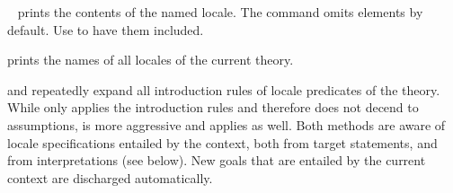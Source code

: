 \begin{isabellebody}
\begin{isamarkuptext}
\begin{description}
  \item \hyperlink{command.print-locale}{\mbox{}}~ prints the
  contents of the named locale.  The command omits \hyperlink{element.notes}{\mbox{}}
  elements by default.  Use \hyperlink{command.print-locale}{\mbox{}} to
  have them included.

  \item \hyperlink{command.print-locales}{\mbox{}} prints the names of all locales
  of the current theory.

  \item \hyperlink{method.intro-locales}{\mbox{}} and \hyperlink{method.unfold-locales}{\mbox{}}
  repeatedly expand all introduction rules of locale predicates of the
  theory.  While \hyperlink{method.intro-locales}{\mbox{}} only applies the  introduction rules and therefore does not decend to
  assumptions, \hyperlink{method.unfold-locales}{\mbox{}} is more aggressive and applies
   as well.  Both methods are aware of locale
  specifications entailed by the context, both from target statements,
  and from interpretations (see below).  New goals that are entailed
  by the current context are discharged automatically.


\end{description}
\end{isamarkuptext}
\end{isabellebody}
